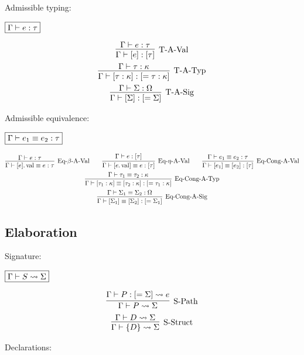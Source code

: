 Admissible typing:

$\fbox{$\Gamma \vdash e: \tau$}$

\begin{gather*}
  \infer[\text{T-A-Val}]{\Gamma \vdash [e]: [\tau]}{
    \Gamma \vdash e: \tau
  }
  \\
  \infer[\text{T-A-Typ}]{\Gamma \vdash [\tau: \kappa]: [= \tau: \kappa]}{
    \Gamma \vdash \tau: \kappa
  }
  \\
  \infer[\text{T-A-Sig}]{\Gamma \vdash [\Sigma]: [= \Sigma]}{
    \Gamma \vdash \Sigma: \Omega
  }
\end{gather*}

Admissible equivalence:

$\fbox{$\Gamma \vdash e_1 \equiv e_2: \tau$}$

\begin{gather*}
  \infer[\text{Eq-$\beta$-A-Val}]{\Gamma \vdash [e].\symval \equiv e: \tau}{
    \Gamma \vdash e: \tau
  }
  \hspace{2em}
  \infer[\text{Eq-$\eta$-A-Val}]{\Gamma \vdash [e.\symval] \equiv e: [\tau]}{
    \Gamma \vdash e: [\tau]
  }
  \hspace{2em}
  \infer[\text{Eq-Cong-A-Val}]{\Gamma \vdash [e_1] \equiv [e_2]: [\tau]}{
    \Gamma \vdash e_1 \equiv e_2: \tau
  }
  \\
  \infer[\text{Eq-Cong-A-Typ}]{\Gamma \vdash [\tau_1: \kappa] \equiv [\tau_2: \kappa]: [= \tau_1: \kappa]}{
    \Gamma \vdash \tau_1 \equiv \tau_2: \kappa
  }
  \\
  \infer[\text{Eq-Cong-A-Sig}]{\Gamma \vdash [\Sigma_1] \equiv [\Sigma_2]: [= \Sigma_1]}{
    \Gamma \vdash \Sigma_1 \equiv \Sigma_2: \Omega
  }
\end{gather*}

\subsection{Elaboration}

Signature:

$\fbox{$\Gamma \vdash S \rightsquigarrow \Sigma$}$

\begin{gather*}
  \infer[\text{S-Path}]{\Gamma \vdash P \elaborate \Sigma}{
    \Gamma \vdash P: [= \Sigma] \elaborate e
  }
  \\
  \infer[\text{S-Struct}]{\Gamma \vdash \{D\} \elaborate \Sigma}{
    \Gamma \vdash D \elaborate \Sigma
  }
\end{gather*}

Declarations:

